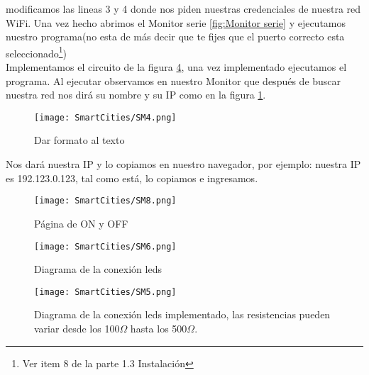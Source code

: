 \documentclass[
	11pt, %
	fleqn, %
	a4paper, %
]{LegrandOrangeBook}
\begin{document}
modificamos las lineas 3 y 4 donde nos piden nuestras credenciales de nuestra red WiFi. Una vez hecho abrimos el Monitor serie \ref{fig:Monitor serie} y ejecutamos nuestro programa(no esta de más decir que te fijes que el puerto correcto esta seleccionado\footnote{Ver item 8 de la parte 1.3 Instalación})\\
Implementamos el circuito de la figura \ref{fig:espleds2}, una vez implementado ejecutamos el programa.
Al ejecutar observamos en nuestro Monitor que después de buscar nuestra red nos dirá su nombre y su IP como en la figura \ref{fig:wifi+ip}.
\begin{figure}[h]
\centering\texttt{[image: SmartCities/SM4.png]}
\caption{Dar formato al texto}
\label{fig:wifi+ip}
\end{figure}
Nos dará nuestra IP y lo copiamos en nuestro navegador, por ejemplo: nuestra IP es 192.123.0.123, tal como está, lo copiamos e ingresamos.
\begin{figure}[h]
\centering
\texttt{[image: SmartCities/SM8.png]}
\caption{Página de ON y OFF}
\label{fig:paginaonoff}
\end{figure}
\begin{figure}[H]
\centering
\texttt{[image: SmartCities/SM6.png]}
\caption{Diagrama de la conexión leds}
\label{espleds1}
\end{figure}
\begin{figure}[H]
\centering
\texttt{[image: SmartCities/SM5.png]}
\caption{Diagrama de la conexión leds implementado, las resistencias pueden variar desde los 100$\Omega$ hasta los 500$\Omega$.}
\label{fig:espleds2}
\end{figure}
\newpage
\end{document}
